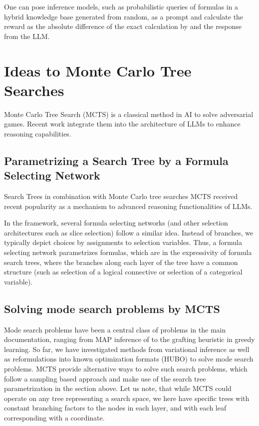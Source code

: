 \documentclass[aps,onecolumn,nofootinbib,pra]{article}
\begin{document}
One can pose \tnreason{} inference models, such as probabilistic queries of formulas in a hybrid knowledge base generated from random, as a prompt and calculate the reward as the absolute difference of the exact calculation by \tnreason{} and the response from the LLM.


\section{Ideas to Monte Carlo Tree Searches}

Monte Carlo Tree Search (MCTS) is a classical method in AI to solve adversarial games.
Recent work \cite{besta_reasoning_2025,xin_deepseek-prover-v15_2024} integrate them into the architecture of LLMs to enhance reasoning capabilities.


\subsection{Parametrizing a Search Tree by a Formula Selecting Network}

Search Trees in combination with Monte Carlo tree searches MCTS received recent popularity as a mechanism to advanced reasoning functionalities of LLMs.

In the \tnreason{} framework, several formula selecting networks (and other selection architectures such as slice selection) follow a similar idea.
Instead of branches, we typically depict choices by assignments to selection variables.
Thus, a formula selecting network parametrizes formulas, which are in the expressivity of formula search trees, where the branches along each layer of the tree have a common structure (such as selection of a logical connective or selection of a categorical variable).



\subsection{Solving mode search problems by MCTS}

Mode search problems have been a central class of problems in the main documentation, ranging from MAP inference of \MarkovLogicNetworks{} to the grafting heuristic in greedy learning.
So far, we have investigated methods from variational inference as well as reformulations into known optimization formats (HUBO) to solve mode search problems.
MCTS provide alternative ways to solve such search problems, which follow a sampling based approach and make use of the search tree parametrization in the section above.
Let us note, that while MCTS could operate on any tree representing a search space, we here have specific trees with constant branching factors to the nodes in each layer, and with each leaf corresponding with a coordinate.
\end{document}
